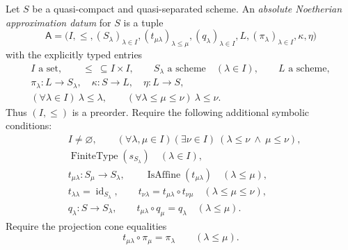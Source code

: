 \begin{definition}
  \label{def:nagata-absolute-noetherian-approximation-datum}
  \lean{}

  Let \(S\) be a quasi-compact and quasi-separated scheme.  An
  \emph{absolute Noetherian approximation datum} for \(S\) is a tuple
  \[
    \mathsf A=
    \bigl(I,\leq,(S_\lambda)_{\lambda\in I},
      (t_{\mu\lambda})_{\lambda\leq\mu},
      (q_\lambda)_{\lambda\in I},
      L,(\pi_\lambda)_{\lambda\in I},\kappa,\eta\bigr)              \tag{68}
  \]
  with the explicitly typed entries
  \[
  \begin{gathered}
    I\text{ a set},\qquad {\leq}\ \subseteq I\times I,\qquad
    S_\lambda\text{ a scheme}\quad(\lambda\in I),\qquad
    L\text{ a scheme},\\
    \pi_\lambda\colon L\to S_\lambda,\quad
    \kappa\colon S\to L,\quad \eta\colon L\to S,\\
    (\forall\lambda\in I)\ \lambda\leq\lambda,\qquad
    (\forall\lambda\leq\mu\leq\nu)\ \lambda\leq\nu .
  \end{gathered}                                                     \tag{68a}
  \]
  Thus \((I,\leq)\) is a preorder.  Require the following additional
  symbolic conditions:
  \begin{align}
    &I\neq\varnothing,\qquad
    (\forall\lambda,\mu\in I)(\exists\nu\in I)\ 
      (\lambda\leq\nu\ \wedge\ \mu\leq\nu),                         \tag{69}\\
    &\operatorname{FiniteType}(s_{S_\lambda})
      \quad(\lambda\in I),                                          \tag{70}\\
    &t_{\mu\lambda}\colon S_\mu\to S_\lambda,\qquad
      \operatorname{IsAffine}(t_{\mu\lambda})
      \quad(\lambda\leq\mu),                                        \tag{71}\\
    &t_{\lambda\lambda}=\operatorname{id}_{S_\lambda},\qquad
    t_{\nu\lambda}=t_{\mu\lambda}\circ t_{\nu\mu}
      \quad(\lambda\leq\mu\leq\nu),                                 \tag{72}\\
    &q_\lambda\colon S\to S_\lambda,\qquad
    t_{\mu\lambda}\circ q_\mu=q_\lambda
      \quad(\lambda\leq\mu).                                        \tag{73}
  \end{align}
  Require the projection cone equalities
  \[
    t_{\mu\lambda}\circ\pi_\mu=\pi_\lambda
      \qquad(\lambda\leq\mu).                                      \tag{73a}
\]
\end{definition}
